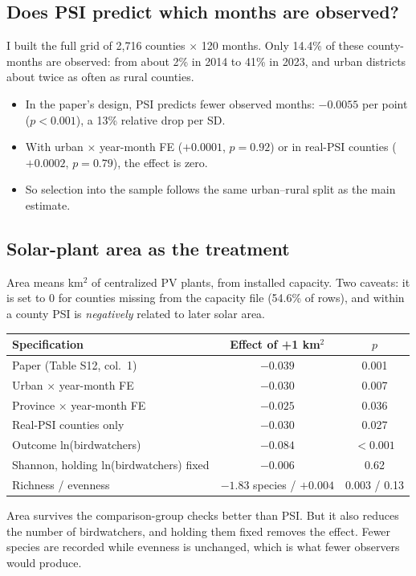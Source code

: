 \documentclass[11pt]{article}
\begin{document}
\subsection{Does PSI predict which months are observed?}
I built the full grid of 2,716 counties $\times$ 120 months. Only 14.4\% of these county-months are observed: from about 2\% in 2014 to 41\% in 2023, and urban districts about twice as often as rural counties.
\begin{itemize}
\item In the paper's design, PSI predicts fewer observed months: $-0.0055$ per point ($p<0.001$), a 13\% relative drop per SD.
\item With urban $\times$ year-month FE ($+0.0001$, $p=0.92$) or in real-PSI counties ($+0.0002$, $p=0.79$), the effect is zero.
\item So selection into the sample follows the same urban--rural split as the main estimate.
\end{itemize}

\subsection{Solar-plant area as the treatment}
Area means km$^2$ of centralized PV plants, from installed capacity. Two caveats: it is set to 0 for counties missing from the capacity file (54.6\% of rows), and within a county PSI is \emph{negatively} related to later solar area.
\begin{center}
\small
\begin{tabular}{l c c}
\toprule
Specification & Effect of +1 km$^2$ & $p$ \\
\midrule
Paper (Table S12, col.\ 1) & $-0.039$ & 0.001 \\
Urban $\times$ year-month FE & $-0.030$ & 0.007 \\
Province $\times$ year-month FE & $-0.025$ & 0.036 \\
Real-PSI counties only & $-0.030$ & 0.027 \\
Outcome ln(birdwatchers) & $-0.084$ & $<0.001$ \\
Shannon, holding ln(birdwatchers) fixed & $-0.006$ & 0.62 \\
Richness / evenness & $-1.83$ species / $+0.004$ & 0.003 / 0.13 \\
\bottomrule
\end{tabular}
\end{center}
Area survives the comparison-group checks better than PSI. But it also reduces the number of birdwatchers, and holding them fixed removes the effect. Fewer species are recorded while evenness is unchanged, which is what fewer observers would produce.
\end{document}
